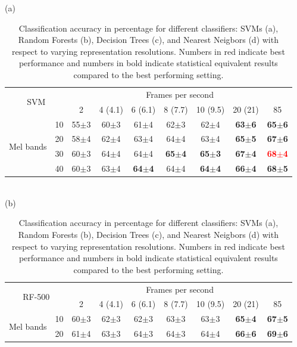 \documentclass[12pt,times,onecolumn]{article}
\begin{document}
\begin{table}[h!]
\centering
\caption{Classification accuracy in percentage for different classifiers: SVMs (a), Random Forests (b), Decision Trees (c), and Nearest Neigbors (d) with respect to varying representation resolutions. Numbers in red indicate best performance and numbers in bold indicate statistical equivalent results compared to the best performing setting.}
\label{T2}
(a)\\
\begin{tabular}{ll|c|c|c|c|c|c|c|}
\cline{3-9}
\multicolumn{2}{c}{\multirow{2}{*}{SVM}} & \multicolumn{7}{|c|}{Frames per second}\\ \cline{3-9}
 & & 2 & 4 (4.1) & 6 (6.1) & 8 (7.7) & 10 (9.5) & 20 (21) & 85 \\ \cline{1-9}
\multicolumn{1}{|c}{\multirow{4}{*}{Mel bands}}
 & \multicolumn{1}{|c|}{10} & 55$\pm$3 & 60$\pm$3 & 61$\pm$4 & 62$\pm$3 & 62$\pm$4 & \textbf{63$\pm$6} & \textbf{65$\pm$6} \\ \cline{2-9}
\multicolumn{1}{|c}{}
 & \multicolumn{1}{|c|}{20} & 58$\pm$4 & 62$\pm$4 & 63$\pm$4 & 64$\pm$4 & 63$\pm$4 & \textbf{65$\pm$5} & \textbf{67$\pm$6} \\ \cline{2-9}
\multicolumn{1}{|c}{}
 & \multicolumn{1}{|c|}{30} & 60$\pm$3 & 64$\pm$4 & 64$\pm$4 & \textbf{65$\pm$4} & \textbf{65$\pm$3} & \textbf{67$\pm$4} & \textbf{\textcolor{red}{68$\pm$4}} \\ \cline{2-9}
\multicolumn{1}{|c}{}
 & \multicolumn{1}{|c|}{40} & 60$\pm$3 & 63$\pm$4 & \textbf{64$\pm$4} & 64$\pm$4 & \textbf{64$\pm$4} & \textbf{66$\pm$4} & \textbf{68$\pm$5} \\ \cline{1-9}
\end{tabular}
\\(b)\\
\begin{tabular}{ll|c|c|c|c|c|c|c|}
\cline{3-9}
\multicolumn{2}{c}{\multirow{2}{*}{RF-500}} & \multicolumn{7}{|c|}{Frames per second}\\ \cline{3-9}
 & & 2 & 4 (4.1) & 6 (6.1) & 8 (7.7) & 10 (9.5) & 20 (21) & 85 \\ \cline{1-9}
\multicolumn{1}{|c}{\multirow{4}{*}{Mel bands}}
 & \multicolumn{1}{|c|}{10} & 60$\pm$3 & 62$\pm$3 & 62$\pm$3 & 63$\pm$3 & 63$\pm$3 & \textbf{65$\pm$4} & \textbf{67$\pm$5} \\ \cline{2-9}
\multicolumn{1}{|c}{}
 & \multicolumn{1}{|c|}{20} & 61$\pm$4 & 63$\pm$3 & 64$\pm$3 & 64$\pm$3 & 64$\pm$4 & \textbf{66$\pm$6} & \textbf{69$\pm$6} \\ \cline{2-9}

\end{tabular}
\end{table}
\end{document}
